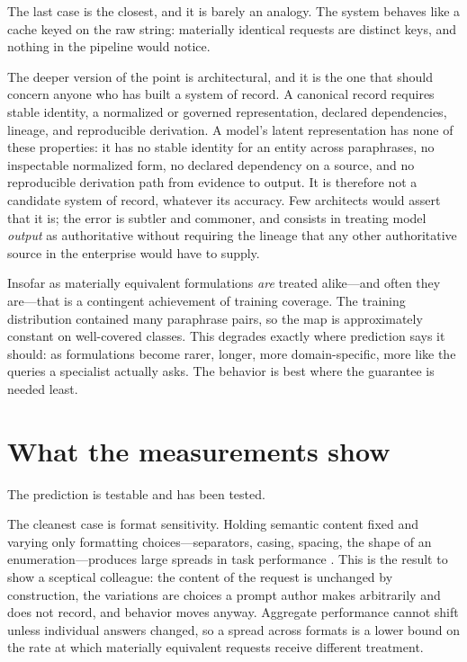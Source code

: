 The last case is the closest, and it is barely an analogy. The system behaves like a
cache keyed on the raw string: materially identical requests are distinct keys, and
nothing in the pipeline would notice.

The deeper version of the point is architectural, and it is the one that should
concern anyone who has built a system of record. A canonical record requires stable
identity, a normalized or governed representation, declared dependencies, lineage,
and reproducible derivation. A model's latent representation has none of these
properties: it has no stable identity for an entity across paraphrases, no
inspectable normalized form, no declared dependency on a source, and no reproducible
derivation path from evidence to output. It is therefore not a candidate system of
record, whatever its accuracy. Few architects would assert that it is; the error is
subtler and commoner, and consists in treating model \emph{output} as authoritative
without requiring the lineage that any other authoritative source in the enterprise
would have to supply.

Insofar as materially equivalent formulations \emph{are} treated alike---and often
they are---that is a contingent achievement of training coverage. The training
distribution contained many paraphrase pairs, so the map is approximately constant
on well-covered classes. This degrades exactly where prediction says it should: as
formulations become rarer, longer, more domain-specific, more like the queries a
specialist actually asks. The behavior is best where the guarantee is needed
least.

\section{What the measurements show}

The prediction is testable and has been tested.

The cleanest case is format sensitivity. Holding semantic content fixed
and varying only formatting choices---separators, casing, spacing, the shape of an
enumeration---produces large spreads in task performance \citep{sclar2024}. This is
the result to show a sceptical colleague: the content of the request is unchanged by
construction, the variations are choices a prompt author makes arbitrarily and does
not record, and behavior moves anyway. Aggregate performance cannot shift unless
individual answers changed, so a spread across formats is a lower bound on the rate
at which materially equivalent requests receive different treatment.

